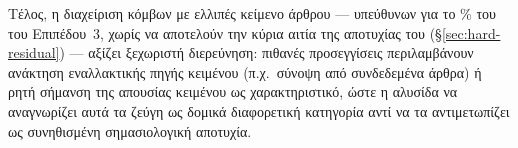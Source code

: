 Τέλος, η διαχείριση κόμβων με ελλιπές κείμενο άρθρου --- υπεύθυνων για το \HardResMissingPct\% του
 του Επιπέδου~3, χωρίς να αποτελούν την κύρια αιτία της
αποτυχίας του (\S\ref{sec:hard-residual}) --- αξίζει ξεχωριστή διερεύνηση: πιθανές
προσεγγίσεις περιλαμβάνουν ανάκτηση εναλλακτικής πηγής κειμένου (π.χ.\ σύνοψη από
συνδεδεμένα άρθρα) ή ρητή σήμανση της απουσίας κειμένου ως χαρακτηριστικό, ώστε η
αλυσίδα να αναγνωρίζει αυτά τα ζεύγη ως δομικά διαφορετική κατηγορία αντί να τα
αντιμετωπίζει ως συνηθισμένη σημασιολογική αποτυχία.
